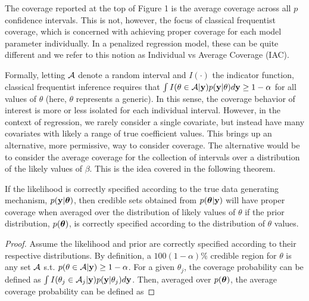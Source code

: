 The coverage reported at the top of Figure 1 is the average coverage across all $p$ confidence intervals. This is not, however, the focus of classical frequentist coverage, which is concerned with achieving proper coverage for each model parameter individually. In a penalized regression model, these can be quite different and we refer to this notion as Individual vs Average Coverage (IAC).

Formally, letting $\mathcal{A}$ denote a random interval and $I(\cdot)$ the indicator function, classical frequentist inference requires that $\int I(\theta \in \mathcal{A} | \mathbf{y}) p(\mathbf{y} | \theta) d\mathbf{y} \ge 1 - \alpha$ for all values of $\theta$ (here, $\theta$ represents a generic). In this sense, the coverage behavior of interest is more or less isolated for each individual interval. However, in the context of regression, we rarely consider a single covariate, but instead have many covariates with likely a range of true coefficient values. This brings up an alternative, more permissive, way to consider coverage. The alternative would be to consider the average coverage for the collection of intervals over a distribution of the likely values of $\beta$. This is the idea covered in the following theorem.

\begin{thm}
  \label{Thm:bcc}
  If the likelihood is correctly specified according to the true data generating mechanism, $p(\mathbf{y} | \boldsymbol{\theta})$, then credible sets obtained from $p(\boldsymbol{\theta}|\mathbf{y})$ will have proper coverage when averaged over the distribution of likely values of $\theta$ if the prior distribution, $p(\boldsymbol{\theta})$, is correctly specified according to the distribution of $\theta$ values.
\end{thm}

\begin{proof}
Assume the likelihood and prior are correctly specified according to their respective distributions. By definition, a $100(1-\alpha)\%$ credible region for $\theta$ is any set $\mathcal{A}$ s.t. $p(\theta \in \mathcal{A} | \mathbf{y}) \geq 1 - \alpha$. For a given $\theta_j$, the coverage probability can be defined as $\int I(\theta_j \in \mathcal{A}_j | \mathbf{y}) p(\mathbf{y} | \theta_j)d\mathbf{y}$. Then, averaged over $p(\boldsymbol{\theta})$, the average coverage probability can be defined as


\end{proof}

